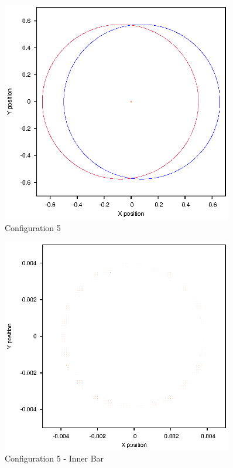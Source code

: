 \documentclass[a4paper,12pt]{article}
\begin{document}
\begin{figure}[H]
\centering
\includegraphics[width=0.9\textwidth]{./2016results/004-55-004/Orbit.eps}
\caption{Configuration 5}
\label{fig:config5}
\end{figure}
\begin{figure}[H]
\centering
\includegraphics[width=0.9\textwidth]{./2016results/004-55-004/Inner.eps}
\caption{Configuration 5 - Inner Bar}
\label{fig:config5i}
\end{figure}
\end{document}
